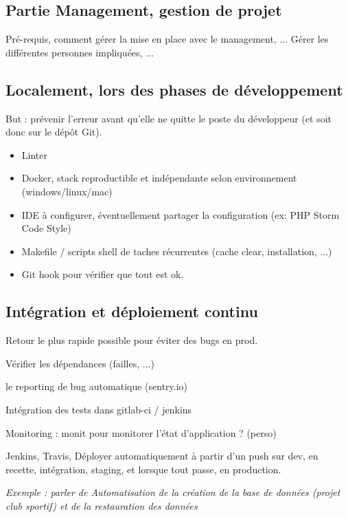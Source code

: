 
\subsection{Partie Management, gestion de projet}

Pré-requis, comment gérer la mise en place avec le management, ... Gérer les différentes personnes impliquées, ...

\subsection{Localement, lors des phases de développement}

But : prévenir l'erreur avant qu'elle ne quitte le poste du développeur (et soit donc sur le dépôt Git).

 \begin{itemize}
 	\item Linter
 	\item Docker, stack reproductible et indépendante selon environnement (windows/linux/mac) 
 	\item IDE à configurer, éventuellement partager la configuration (ex: PHP Storm Code Style)
 	\item Makefile / scripts shell de taches récurrentes (cache clear, installation, ...)
 	\item Git hook pour vérifier que tout est ok.
 \end{itemize}

\subsection{Intégration et déploiement continu}

Retour le plus rapide possible pour éviter des bugs en prod. 

Vérifier les dépendances (failles, ...)

le reporting de bug automatique (sentry.io)

Intégration des tests dans gitlab-ci / jenkins

Monitoring : monit pour monitorer l'état d'application ? (perso)

Jenkins, Travis, Déployer automatiquement à partir d'un push sur dev, en recette, intégration, staging, et lorsque tout passe, en production.

\textit{Exemple : parler de \clubSportif Automatisation de la création de la base de données (projet club sportif) et de la restauration des données}


